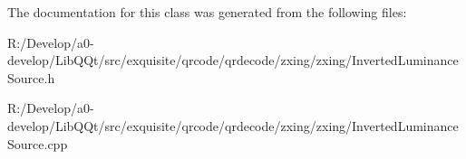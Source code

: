 The documentation for this class was generated from the following files\+:\begin{DoxyCompactItemize}
\item 
R\+:/\+Develop/a0-\/develop/\+Lib\+Q\+Qt/src/exquisite/qrcode/qrdecode/zxing/zxing/Inverted\+Luminance\+Source.\+h\item 
R\+:/\+Develop/a0-\/develop/\+Lib\+Q\+Qt/src/exquisite/qrcode/qrdecode/zxing/zxing/Inverted\+Luminance\+Source.\+cpp\end{DoxyCompactItemize}
